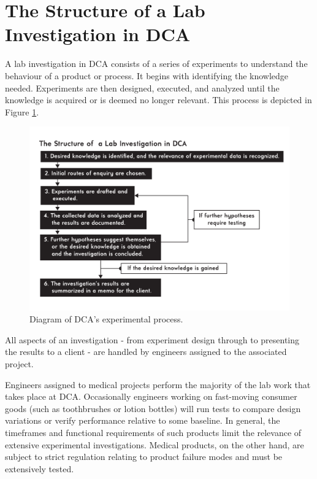 \documentclass[11pt,a4paper,article]{memoir} %
\begin{document}
\section{The Structure of a Lab Investigation in DCA}
A lab investigation in DCA consists of a series of experiments to understand the behaviour of a product or process. It begins with identifying the knowledge needed. Experiments are then designed, executed, and analyzed until the knowledge is acquired or is deemed no longer relevant. This process is depicted in Figure \ref{fig:investigation_diagram}.
\begin{figure}[h!]
\centering
\includegraphics[width=1.2\textwidth]{Lab_Investigation_Diagram.pdf}
\caption{Diagram of DCA's experimental process.}
\label{fig:investigation_diagram}
\end{figure}
All aspects of an investigation - from experiment design through to presenting the results to a client - are handled by engineers assigned to the associated project. 
\par
Engineers assigned to medical projects perform the majority of the lab work that takes place at DCA. Occasionally engineers working on fast-moving consumer goods (such as toothbrushes or lotion bottles) will run tests to compare design variations or verify performance relative to some baseline. In general, the timeframes and functional requirements of such products limit the relevance of extensive experimental investigations. Medical products, on the other hand, are subject to strict regulation relating to product failure modes and must be extensively tested.
\par
\end{document}

